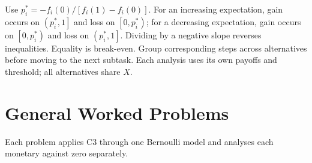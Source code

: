 Use $p_i^*=-f_i(0)/[f_i(1)-f_i(0)]$. For an increasing expectation,
gain occurs on $\left(p_i^*,1\right]$ and loss on $\left[0,p_i^*\right)$; for a decreasing expectation,
gain occurs on $\left[0,p_i^*\right)$ and loss on $\left(p_i^*,1\right]$. Dividing by a negative slope reverses inequalities.
Equality is break-even. Group corresponding steps across alternatives before moving to the next subtask.
Each analysis uses its own payoffs and threshold; all alternatives share $X$.
\enlargethispage{\baselineskip}
\clearpage
\section{General Worked Problems}\label{sec:t2-c3-general}
Each problem applies C3 through one Bernoulli model and analyses each monetary  against zero separately.
